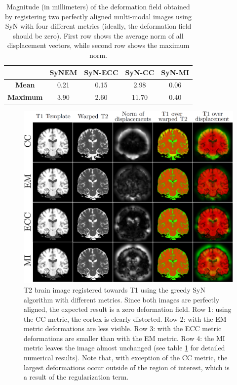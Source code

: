 \begin{table}[htbp]
  \centering
  {\small
    \begin{tabular}{ccccc}
    \toprule
    \textbf{} & \textbf{SyNEM} & \textbf{SyN-ECC} & \textbf{SyN-CC} &\textbf{SyN-MI} \\
    \midrule
    \textbf{Mean}    & 0.21 & 0.15 &  2.98 & 0.06 \\
    \textbf{Maximum} & 3.90 & 2.60 & 11.70 &  0.40\\
    \bottomrule
    \end{tabular}%
    \caption{Magnitude (in millimeters) of the deformation field obtained by registering two perfectly aligned multi-modal images using SyN with four different metrics (ideally, the deformation field should be zero). First row shows the average norm of all displacement
    vectors, while second row shows the maximum norm.}
  \label{tab:deformation_magnitude}}%
\end{table}%


\begin{figure}[H]
\centering
\includegraphics[width=1.0\linewidth]{./images/t1_t2_reg_pannel.png}
\caption{T2 brain image registered towards T1 using the greedy SyN algorithm with different metrics. Since both images are perfectly aligned, the expected result is a zero deformation field. Row 1: using the CC metric, the cortex is clearly distorted. Row 2: with the EM metric deformations are less visible. Row 3: with the ECC metric deformations are smaller than with the EM metric. Row 4: the MI metric leaves the image almost unchanged (see table \ref{tab:deformation_magnitude} for detailed numerical results). Note that, with exception of the CC metric, the largest deformations occur outside of the region of interest, which is a result of the regularization term.}
\label{fig:t1_t2_reg_pannel}
\end{figure}

